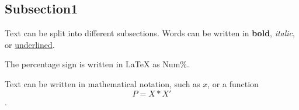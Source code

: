 \subsection{Subsection1}

Text can be split into different subsections. Words can be written in \textbf{bold}, \emph{italic}, or \underline{underlined}.

The percentage sign is written in LaTeX as Num\%.

Text can be written in mathematical notation, such as $x$, or a function \[P = X * X'\].